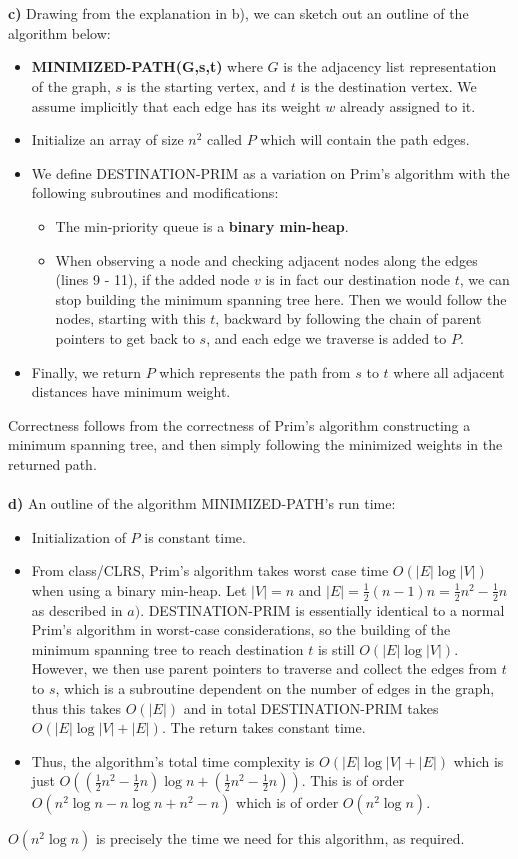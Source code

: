 \documentclass[11pt]{article}
\begin{document}
\begin{solution}
\\\\
\textbf{c)} Drawing from the explanation in b), we can sketch out an outline of the algorithm below:
\begin{itemize}
    \item \textbf{MINIMIZED-PATH(G,s,t)} where $G$ is the adjacency list representation of the graph, $s$ is the starting vertex, and $t$ is the destination vertex. We assume implicitly that each edge has its weight $w$ already assigned to it.
    \item Initialize an array of size $n^2$ called $P$ which will contain the path edges.
    \item We define DESTINATION-PRIM as a variation on Prim's algorithm with the following subroutines and modifications:
    \begin{itemize}
        \item The min-priority queue is a \textbf{binary min-heap}.
        \item When observing a node and checking adjacent nodes along the edges (lines 9 - 11), if the added node $v$ is in fact our destination node $t$, we can stop building the minimum spanning tree here. Then we would follow the nodes, starting with this $t$, backward by following the chain of parent pointers to get back to $s$, and each edge we traverse is added to $P$.
    \end{itemize}
    \item Finally, we return $P$ which represents the path from $s$ to $t$ where all adjacent distances have minimum weight.
\end{itemize}
Correctness follows from the correctness of Prim's algorithm constructing a minimum spanning tree, and then simply following the minimized weights in the returned path.
\\\\
\textbf{d)} An outline of the algorithm MINIMIZED-PATH's run time:
\begin{itemize}
    \item Initialization of $P$ is constant time.
    \item From class/CLRS, Prim's algorithm takes worst case time $O(|E| \log{|V|})$ when using a binary min-heap. Let $|V| = n$ and $|E| = \frac{1}{2}(n - 1)n = \frac{1}{2}n^2 - \frac{1}{2}n$ as described in $a)$. DESTINATION-PRIM is essentially identical to a normal Prim's algorithm in worst-case considerations, so the building of the minimum spanning tree to reach destination $t$ is still $O(|E| \log{|V|})$. However, we then use parent pointers to traverse and collect the edges from $t$ to $s$, which is a subroutine dependent on the number of edges in the graph, thus this takes $O(|E|)$ and in total DESTINATION-PRIM takes $O(|E| \log{|V|} + |E|)$. The return takes constant time.
    \item Thus, the algorithm's total time complexity is $O(|E| \log{|V|} + |E|)$ which is just $O((\frac{1}{2}n^2 - \frac{1}{2}n) \log{n} + (\frac{1}{2}n^2 - \frac{1}{2}n))$. This is of order $O(n^2 \log{n} - n \log{n} + n^2 - n)$ which is of order $O(n^2 \log{n})$.
\end{itemize}
$O(n^2 \log{n})$ is precisely the time we need for this algorithm, as required.
\end{solution}
\end{document}
